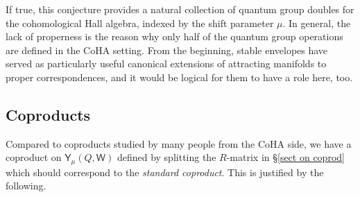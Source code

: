 \documentclass[10pt]{amsart}
\theoremstyle{definition}
\numberwithin{equation}{section}
\newcommand{\sW}{\mathsf{W}}
\begin{document}
If true, this conjecture provides
a natural collection of quantum group doubles for the cohomological Hall
algebra, indexed by the shift parameter $\mu$. In general, the lack
of properness is the reason why only half of the quantum
group operations are defined in the CoHA setting. From the beginning,
stable envelopes have served as particularly useful canonical extensions of
attracting manifolds to proper correspondences, and it would be
logical for them to have a role here, too.

\subsection{Coproducts}

Compared to coproducts studied by many people from the CoHA side, we have a 
coproduct on $\mathsf Y_\mu(Q,\sW)$ defined by splitting the $R$-matrix in \S \ref{sect on coprod} which should correspond to the \textit{standard coproduct}.
This is justified by the following. 
\end{document}
